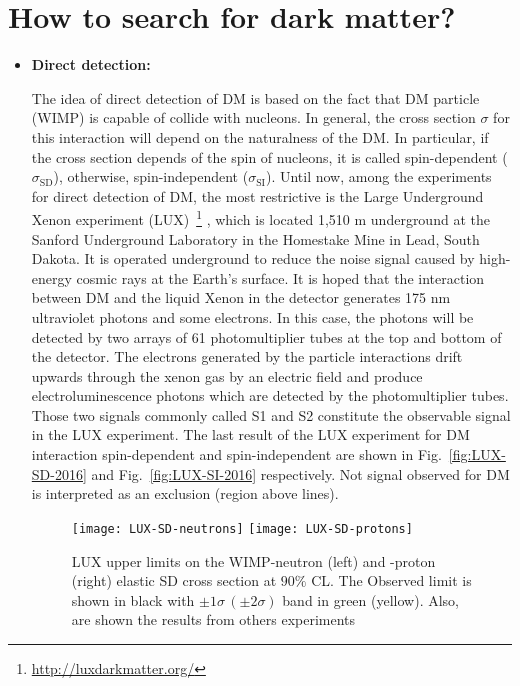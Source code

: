 \section{How to search for dark matter?}
\begin{itemize}

\item \textbf{Direct detection:}

The idea of direct detection of DM is based on the fact that DM particle (WIMP) is capable of collide with nucleons.
%
In general, the cross section $\sigma$ for this interaction will depend on the naturalness of the DM. 
In particular, if the cross section depends of the spin of nucleons, it is called spin-dependent ($\sigma_{\text{SD}}$), otherwise,  spin-independent ($\sigma_{\text{SI}}$).
%
Until now, among the experiments for direct detection of DM, the most restrictive is the Large Underground Xenon experiment (LUX)~\footnote{\url{http://luxdarkmatter.org/}} ,
which is located 1,510 m underground at the Sanford Underground Laboratory in the Homestake Mine in Lead, South Dakota.
It is operated underground to reduce the noise signal caused by high-energy cosmic rays at the Earth's surface.
It is hoped that the interaction between DM and the liquid Xenon in the detector generates 175 nm ultraviolet photons and some electrons.
In this case, the photons will be detected by two arrays of 61 photomultiplier tubes at the top and bottom of the detector. 
The electrons generated by the particle interactions drift upwards through the xenon gas by an electric field and produce electroluminescence photons which are detected by the photomultiplier tubes. 
Those two signals commonly called S1 and S2 constitute the observable signal in the LUX experiment.
The last result of the LUX experiment for DM interaction spin-dependent and spin-independent are shown in Fig.~\ref{fig:LUX-SD-2016} and Fig.~\ref{fig:LUX-SI-2016} respectively. Not signal observed for DM is interpreted as an exclusion (region above lines).
%
\begin{figure}[h]
\begin{center}
\texttt{[image: LUX-SD-neutrons]}
\texttt{[image: LUX-SD-protons]}
\end{center}
\caption{LUX upper limits on the WIMP-neutron (left) and -proton (right) elastic SD cross section at $90\%$ CL.
The Observed limit is shown in black with $\pm 1\sigma \, (\pm 2\sigma)$ band in green (yellow). Also, are shown the results from others experiments 
}
\end{figure}
\end{itemize}
